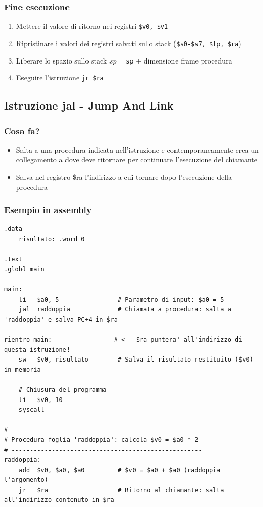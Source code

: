 \subsubsection{Fine esecuzione}
\begin{enumerate}
    \item Mettere il valore di ritorno nei registri \texttt{\$v0, \$v1}
    \item Ripristinare i valori dei registri salvati sullo stack (\texttt{\$s0-\$s7, \$fp, \$ra})
    \item Liberare lo spazio sullo stack \texttt{$sp = $sp} $+$ dimensione frame procedura
    \item Eseguire l'istruzione \texttt{jr \$ra}
\end{enumerate}


\subsection{Istruzione jal - Jump And Link}
\subsubsection{Cosa fa?}
\begin{itemize}
    \item Salta a una procedura indicata nell'istruzione e contemporaneamente  crea un collegamento a dove deve ritornare per continuare l'esecuzione del chiamante
    
    \item Salva nel registro \$ra l'indirizzo a cui tornare dopo l'esecuzione della procedura
\end{itemize}

\subsubsection{Esempio in assembly}
\begin{lstlisting}
.data
    risultato: .word 0

.text
.globl main

main:
    li   $a0, 5                # Parametro di input: $a0 = 5
    jal  raddoppia             # Chiamata a procedura: salta a 'raddoppia' e salva PC+4 in $ra
    
rientro_main:                 # <-- $ra puntera' all'indirizzo di questa istruzione!
    sw   $v0, risultato        # Salva il risultato restituito ($v0) in memoria
    
    # Chiusura del programma
    li   $v0, 10               
    syscall

# ----------------------------------------------------
# Procedura foglia 'raddoppia': calcola $v0 = $a0 * 2
# ----------------------------------------------------
raddoppia:
    add  $v0, $a0, $a0         # $v0 = $a0 + $a0 (raddoppia l'argomento)
    jr   $ra                   # Ritorno al chiamante: salta all'indirizzo contenuto in $ra
\end{lstlisting}

